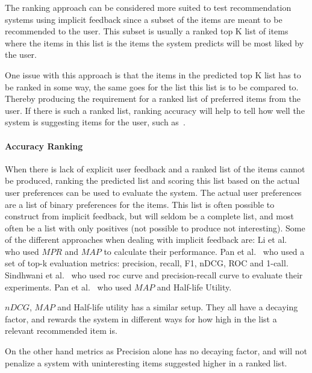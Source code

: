 The ranking approach can be considered more suited to test recommendation
systems using implicit feedback since a subset of the items are meant to be
recommended to the user.  This subset is usually a ranked top K list of items
where the items in this list is the items the system predicts will be most
liked by the user.

One issue with this approach is that the items in the predicted top K list has
to be ranked in some way, the same goes for the list this list is to be
compared to.  Thereby producing the requirement for a ranked list of preferred
items from the user.  If there is such a ranked list, ranking accuracy will
help to tell how well the system is suggesting items for the user, such
as~\cite{Yilmaz:2008:NRC:1390334.1390435}.


\paragraph{Accuracy Ranking}
\label{par:usage_prediction}

When there is lack of explicit user feedback and a ranked list of the items
cannot be produced, ranking the predicted list and scoring this list based on
the actual user preferences can be used to evaluate the system.  The actual
user preferences are a list of binary preferences for the items.  This list is
often possible to construct from implicit feedback, but will seldom be a
complete list, and most often be a list with only positives (not possible to
produce not interesting).  Some of the different approaches when dealing with
implicit feedback are: Li et al.~\cite{deLace2010} who used $MPR$ and $MAP$ to
calculate their performance.  Pan et al.~\cite{Pan:2013:GGP:2540128.2540516}
who used a set of top-k evaluation metrics: precision, recall, F1, nDCG, ROC
and 1-call.  Sindhwani et al.~\cite{Sindhwani:2010:OMC:1933307.1934641} who
used roc curve and precision-recall curve to evaluate their experiments.  Pan
et al.~\cite{pan2008} who used $MAP$ and Half-life Utility.

$nDCG$, $MAP$ and Half-life utility has a similar setup.  They all have a
decaying factor, and rewards the system in different ways for how high in the
list a relevant recommended item is.

On the other hand metrics as Precision alone has no decaying factor, and will
not penalize a system with uninteresting items suggested higher in a ranked
list.

